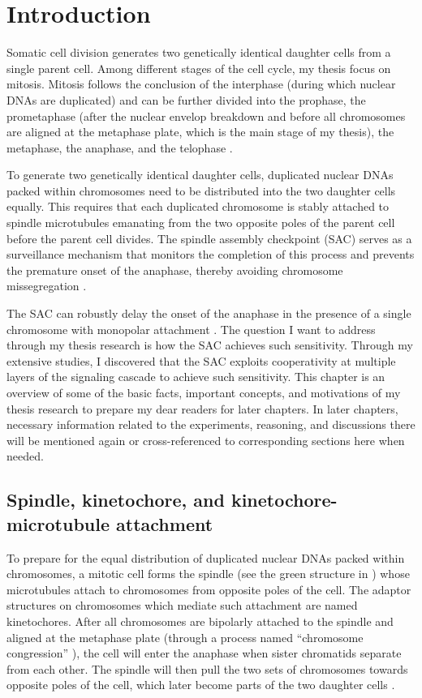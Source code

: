\chapter{Introduction}
\label{chpt:introduction}

Somatic cell division generates two genetically identical daughter cells from a single parent cell. Among different stages of the cell cycle, my thesis focus on mitosis. Mitosis follows the conclusion of the interphase (during which nuclear DNAs are duplicated) and can be further divided into the prophase, the prometaphase (after the nuclear envelop breakdown and before all chromosomes are aligned at the metaphase plate, which is the main stage of my thesis), the metaphase, the anaphase, and the telophase \cite{MBC4}.

To generate two genetically identical daughter cells, duplicated nuclear DNAs packed within chromosomes need to be distributed into the two daughter cells equally. This requires that each duplicated chromosome is stably attached to spindle microtubules emanating from the two opposite poles of the parent cell before the parent cell divides. The spindle assembly checkpoint (SAC) serves as a surveillance mechanism that monitors the completion of this process and prevents the premature onset of the anaphase, thereby avoiding chromosome missegregation \cite{MBC4}.

The SAC can robustly delay the onset of the anaphase in the presence of a single chromosome with monopolar attachment \cite{PtK1SingleUnattachedKT}. The question I want to address through my thesis research is how the SAC achieves such sensitivity. Through my extensive studies, I discovered that the SAC exploits cooperativity at multiple layers of the signaling cascade to achieve such sensitivity. This chapter is an overview of some of the basic facts, important concepts, and motivations of my thesis research to prepare my dear readers for later chapters. In later chapters, necessary information related to the experiments, reasoning, and discussions there will be mentioned again or cross-referenced to corresponding sections here when needed.

\section{Spindle, kinetochore, and kinetochore-microtubule attachment}

To prepare for the equal distribution of duplicated nuclear DNAs packed within chromosomes, a mitotic cell forms the spindle (see the green structure in ) whose microtubules attach to chromosomes from opposite poles of the cell. The adaptor structures on chromosomes which mediate such attachment are named kinetochores. After all chromosomes are bipolarly attached to the spindle and aligned at the metaphase plate (through a process named ``chromosome congression'' \cite{ChromosomeCongression}), the cell will enter the anaphase when sister chromatids separate from each other. The spindle will then pull the two sets of chromosomes towards opposite poles of the cell, which later become parts of the two daughter cells \cite{MBC4}.

